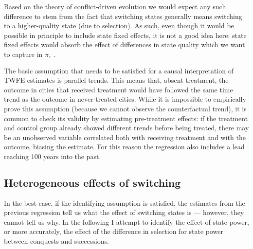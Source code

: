 \documentclass[11pt, a4paper]{article}
\begin{document}

Based on the theory of conflict-driven evolution we would expect any such difference to stem from the fact that switching states generally means switching to a higher-quality state (due to selection). As such, even though it would be possible in principle to include state fixed effects, it is not a good idea here: state fixed effects would absorb the effect of differences in state quality which we want to capture in $\pi_\tau$ \citep[p. 13]{schoenholzer2022}.

The basic assumption that needs to be satisfied for a causal interpretation of TWFE estimates is parallel trends. This means that, absent treatment, the outcome in cities that received treatment would have followed the same time trend as the outcome in never-treated cities. While it is impossible to empirically prove this assumption (because we cannot observe the counterfactual trend), it is common to check its validity by estimating pre-treatment effects: if the treatment and control group already showed different trends before being treated, there may be an unobserved variable correlated both with receiving treatment and with the outcome, biasing the estimate. For this reason the regression also includes a lead reaching 100 years into the past.


\subsection{Heterogeneous effects of switching}

In the best case, if the identifying assumption is satisfied, the estimates from the previous regression tell us what the effect of switching states is --- however, they cannot tell us why. In the following I attempt to identify the effect of state power, or more accurately, the effect of the difference in selection for state power between conquests and successions. 
\end{document}
